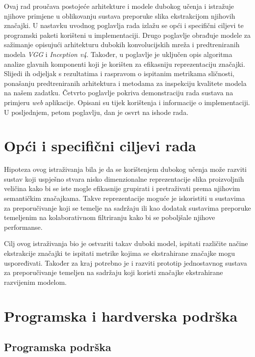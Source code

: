 \documentclass[times, utf8, proizvoljni, numeric]{fer}
\begin{document}
Ovaj rad proučava postojeće arhitekture i modele dubokog učenja i istražuje njihove primjene u oblikovanju sustava preporuke slika ekstrakcijom njihovih značajki. U nastavku uvodnog poglavlja rada izlažu se opći i specifični ciljevi te programski paketi korišteni u implementaciji. Drugo poglavlje obrađuje modele za sažimanje opisujući arhitekturu dubokih konvolucijskih mreža i predtreniranih modela \textit{VGG} i \textit{Inception v4}. Također, u poglavlje je uključen opis algoritma analize glavnih komponenti koji je korišten za efikasniju reprezentaciju značajki. Slijedi ih odjeljak s rezultatima i raspravom o ispitanim metrikama sličnosti, ponašanju predtreniranih arhitektura i metodama za inspekciju kvalitete modela na našem zadatku. Četvrto poglavlje pokriva demonstraciju rada sustava na primjeru \textit{web} aplikacije. Opisani su tijek korištenja i informacije o implementaciji. U posljednjem, petom poglavlju, dan je osvrt na ishode rada.
 


\section{Opći i specifični ciljevi rada}

Hipoteza ovog istraživanja bila je da se korištenjem dubokog učenja može razviti sustav koji uspješno stvara nisko dimenzionalne reprezentacije slika proizvoljnih veličina kako bi se iste mogle efikasnije grupirati i pretraživati prema njihovim semantičkim značajkama. Takve reprezentacije moguće je iskoristiti u sustavima za preporučivanje koji se temelje na sadržaju ili kao dodatak sustavima preporuke temeljenim na kolaborativnom filtriranju kako bi se poboljšale njihove performanse.

Cilj ovog istraživanja bio je ostvariti takav duboki model, ispitati različite načine ekstrakcije značajki te ispitati metrike kojima se ekstrahirane značajke mogu uspoređivati. Također za kraj potrebno je i razviti prototip jednostavnog sustava za preporučivanje temeljen na sadržaju koji koristi značajke ekstrahirane razvijenim modelom.

\section{Programska i hardverska podrška}
\subsection{Programska podrška}
\end{document}
